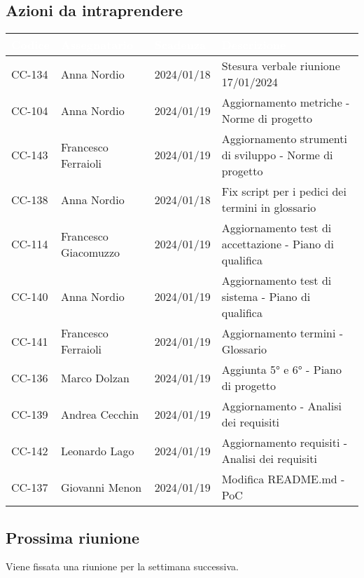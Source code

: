 \subsection{Azioni da intraprendere}
{
    \setlength{\tabcolsep}{10pt}
            \renewcommand{\arraystretch}{1.5}
            \begin{xltabular}{\textwidth}{| l | l | l | X |}
                 \hline
                 \textbf{\textcolor{white}{Codice }} & \textbf{\textcolor{white}{Assegnatario}} & \textbf{\textcolor{white}{Scadenza}} & \textbf{\textcolor{white}{Descrizione}} \\
                 \hline
                 CC-134 & Anna Nordio & 2024/01/18 & Stesura verbale riunione 17/01/2024 \\
                 \hline
                 CC-104 & Anna Nordio & 2024/01/19 & Aggiornamento metriche - Norme di progetto\\
                 \hline
                 CC-143 & Francesco Ferraioli & 2024/01/19 & Aggiornamento strumenti di sviluppo - Norme di progetto\\
                 \hline
                 CC-138 & Anna Nordio & 2024/01/18 & Fix script per i pedici dei termini in glossario \\
                 \hline
                 CC-114 & Francesco Giacomuzzo & 2024/01/19 & Aggiornamento test di accettazione - Piano di qualifica \\
                 \hline
                 CC-140 & Anna Nordio & 2024/01/19 & Aggiornamento test di sistema - Piano di qualifica \\
                 \hline
                 CC-141 & Francesco Ferraioli & 2024/01/19 & Aggiornamento termini - Glossario \\
                 \hline
                 CC-136 & Marco Dolzan & 2024/01/19 & Aggiunta 5°  e 6°  - Piano di progetto \\
                 \hline
                 CC-139 & Andrea Cecchin & 2024/01/19 & Aggiornamento  - Analisi dei requisiti \\
                 \hline
                 CC-142 & Leonardo Lago & 2024/01/19 & Aggiornamento requisiti - Analisi dei requisiti \\
                 \hline
                 CC-137 & Giovanni Menon & 2024/01/19 & Modifica README.md - PoC \\
                 \hline
            \end{xltabular}
}


\subsection{Prossima riunione} \label{subsec:riunione}
Viene fissata una riunione per la settimana successiva.
